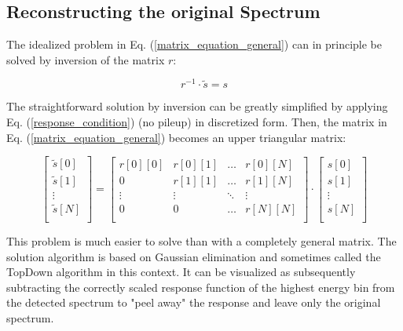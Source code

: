 \documentclass{article}
\begin{document}
\subsection{Reconstructing the original Spectrum}

The idealized problem in Eq. (\ref{matrix_equation_general}) can in principle be solved by inversion of the matrix $r$:

\begin{equation}
	\label{matrix_equation_solved}
	r^{-1} \cdot \tilde{s} = s
\end{equation}

\noindent The straightforward solution by inversion can be greatly simplified by applying Eq. (\ref{response_condition}) (no pileup) in discretized form. 
Then, the matrix in Eq. (\ref{matrix_equation_general}) becomes an upper triangular matrix:

\begin{equation}
	\label{matrix_equation_triangle_explicit}
	\left[ 
		\begin{array}{c}
			\tilde{s}[0] \\
			\tilde{s}[1] \\
			\vdots	\\
			\tilde{s}[N] \\
		\end{array}
	\right]
	= 
	\begin{bmatrix}
		r[0][0] & r[0][1] & \hdots & r[0][N] \\
		0       & r[1][1] & \hdots & r[1][N] \\
		\vdots  & \vdots  & \ddots & \vdots  \\
		0       & 0       & \hdots & r[N][N] \\
	\end{bmatrix}
	\cdot
	\left[ 
		\begin{array}{c}
			s[0] \\
			s[1] \\
			\vdots	\\
			s[N] \\
		\end{array}
	\right]
\end{equation}

\noindent This problem is much easier to solve than with a completely general matrix.
The solution algorithm is based on Gaussian elimination and sometimes called the TopDown algorithm in this context.
It can be visualized as subsequently subtracting the correctly scaled response function of the highest energy bin from the detected spectrum to "peel away" the response and leave only the original spectrum.
\end{document}
